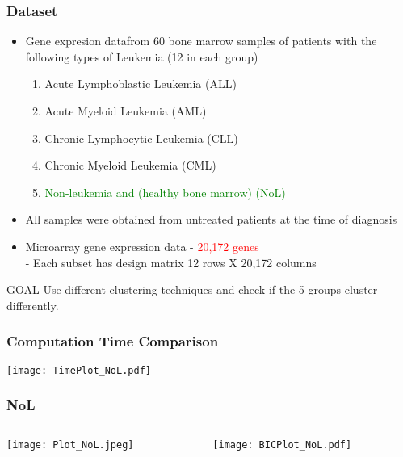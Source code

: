 \documentclass[10pt,dvipsnames,table, handout]{beamer} %
\begin{document}
\begin{frame}
\frametitle{Dataset}
\begin{itemize}
\item Gene expresion data\footnotemark from 60 bone marrow samples of patients with the following types of Leukemia (12 in each group)
\begin{enumerate}
\item Acute Lymphoblastic Leukemia (ALL)
\item Acute Myeloid Leukemia (AML)
\item Chronic Lymphocytic Leukemia (CLL)
\item Chronic Myeloid Leukemia (CML)
\item \textcolor{green}{Non-leukemia and (healthy bone marrow) (NoL)}
\end{enumerate}
\pause \item All samples were obtained from untreated patients at the time of diagnosis
\pause \item Microarray gene expression data - \textcolor{red}{20,172 genes} \\
\hspace{0.5cm} - Each subset has design matrix 12 rows X 20,172 columns
\end{itemize}
\pause 
\begin{block}{GOAL} 
Use different clustering techniques and check if the 5 groups cluster differently.
\end{block}
\end{frame}

\begin{frame}
\frametitle{Computation Time Comparison}
\begin{center}
\texttt{[image: TimePlot\_NoL.pdf]}
\end{center}
\end{frame}

\begin{frame}
\frametitle{NoL}
\begin{columns}
\begin{column}{5cm}
\texttt{[image: Plot\_NoL.jpeg]} \\
\end{column}
\begin{column}{5cm}
\pause \texttt{[image: BICPlot\_NoL.pdf]} \\
\end{column}
\end{columns}
\end{frame}
\end{document}
